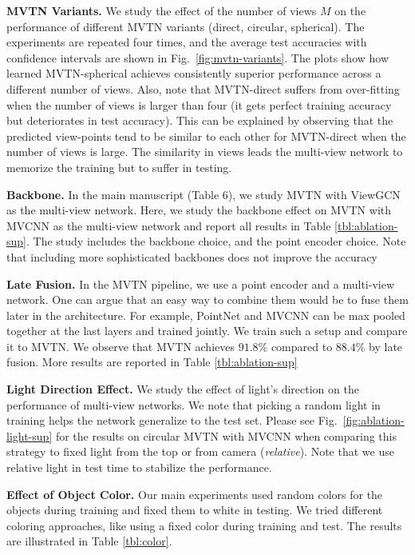 \documentclass[10pt,twocolumn,letterpaper]{article}
\newcommand{\figLabel}{Fig.~}
\newcommand{\mysection}[1]{\noindent\textbf{#1.}}
\begin{document}
\mysection{MVTN Variants} \label{sec:views-supp}
We study the effect of the number of views $M$ on the performance of different MVTN variants (direct, circular, spherical). 
The experiments are repeated four times, and the average test accuracies with confidence intervals are shown in  \figLabel{\ref{fig:mvtn-variants}}. 
 The plots show how learned MVTN-spherical achieves consistently superior performance across a different number of views. Also, note that MVTN-direct suffers from over-fitting when the number of views is larger than four (\ie it gets perfect training accuracy but deteriorates in test accuracy). This can be explained by observing that the predicted view-points tend to be similar to each other for MVTN-direct when the number of views is large. The similarity in views leads the multi-view network to memorize the training but to suffer in testing.

\mysection{Backbone}
In the main manuscript (Table 6), we study MVTN with ViewGCN as the multi-view network. Here, we study the backbone effect on MVTN with MVCNN as the multi-view network and report all results in Table \ref{tbl:ablation-sup}. The study includes the backbone choice, and the point encoder choice. Note that including more sophisticated backbones does not improve the accuracy

\mysection{Late Fusion}
In the MVTN pipeline, we use a point encoder and a multi-view network. One can argue that an easy way to combine them would be to fuse them later in the architecture. For example, PointNet \cite{pointnet} and MVCNN \cite{mvcnn} can be max pooled together at the last layers and trained jointly. We train such a setup and compare it to MVTN. We observe that  MVTN achieves $91.8\%$ compared to $88.4\%$ by late fusion. More results are reported in Table \ref{tbl:ablation-sup}

\mysection{Light Direction Effect}
We study the effect of light's direction on the performance of multi-view networks. We note that picking a random light in training helps the network generalize to the test set. Please see \figLabel{\ref{fig:ablation-light-sup}} for the results on circular MVTN with MVCNN when comparing this strategy to fixed light from the top or from camera (\textit{relative}). Note that we use relative light in test time to stabilize the performance.

\mysection{Effect of Object Color}
Our main experiments used random colors for the objects during training and fixed them to white in testing. We tried different coloring approaches, like using a fixed color during training and test. The results are illustrated in Table \ref{tbl:color}. 
\end{document}
